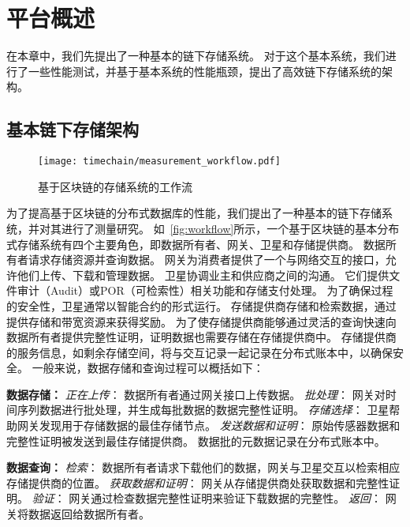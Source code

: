 \chapter{平台概述}
\label{sec:baseline}
在本章中，我们先提出了一种基本的链下存储系统。
对于这个基本系统，我们进行了一些性能测试，并基于基本系统的性能瓶颈，提出了高效链下存储系统的架构。

\section{基本链下存储架构}

\begin{figure}[t]
    \centering
    \texttt{[image: timechain/measurement\_workflow.pdf]}
    \caption{基于区块链的存储系统的工作流}
    \label{fig:workflow}
\end{figure}

为了提高基于区块链的分布式数据库的性能，我们提出了一种基本的链下存储系统，并对其进行了测量研究。
如~\autoref{fig:workflow}所示，一个基于区块链的基本分布式存储系统有四个主要角色，即数据所有者、网关、卫星和存储提供商。
数据所有者请求存储资源并查询数据。
网关为消费者提供了一个与网络交互的接口，允许他们上传、下载和管理数据。
卫星协调业主和供应商之间的沟通。
它们提供文件审计（Audit）或POR（可检索性）相关功能和存储支付处理。
为了确保过程的安全性，卫星通常以智能合约的形式运行。
存储提供商存储和检索数据，通过提供存储和带宽资源来获得奖励。
为了使存储提供商能够通过灵活的查询快速向数据所有者提供完整性证明，证明数据也需要存储在存储提供商中。
存储提供商的服务信息，如剩余存储空间，将与交互记录一起记录在分布式账本中，以确保安全。
一般来说，数据存储和查询过程可以概括如下：

\textbf{数据存储：}
\textit{正在上传}：
数据所有者通过网关接口上传数据。
\textit{批处理}：
网关对时间序列数据进行批处理，并生成每批数据的数据完整性证明。
\textit{存储选择}：
卫星帮助网关发现用于存储数据的最佳存储节点。
\textit{发送数据和证明}：
原始传感器数据和完整性证明被发送到最佳存储提供商。
数据批的元数据记录在分布式账本中。

\textbf{数据查询：}
\textit{检索}：
数据所有者请求下载他们的数据，网关与卫星交互以检索相应存储提供商的位置。
\textit{获取数据和证明}：
网关从存储提供商处获取数据和完整性证明。
\textit{验证}：
网关通过检查数据完整性证明来验证下载数据的完整性。
\textit{返回}：
网关将数据返回给数据所有者。

